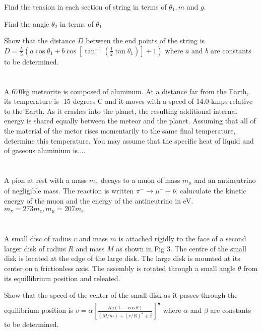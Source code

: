 \documentclass{article}
\newcommand{\half}{\frac{1}{2}}
\newcommand{\<}{\langle}
\renewcommand{\>}{\rangle}
\begin{document}
Find the tension in each section of string in terms of $\theta_1, m$ and $g$.

Find the angle $\theta_2$ in terms of $\theta_1$

Show that the distance $D$ between the end points of the string is $D = \frac{L}{5} (a \cos\theta_1 + b\cos[\tan^{-1}(\half\tan\theta_1)] + 1)$ where $a$ and $b$ are constants to be determined.

\section{}

A 670kg meteorite is composed of aluminum. At a distance far from the Earth, its temperature is -15 degrees C and it moves with a speed of 14.0 kmps relative to the Earth. As it crashes into the planet, the resulting additional internal energy is shared equally between the meteor and the planet. Assuming that all of the material of the metor rises momentarily to the same final temperature, determine this temperature. You may assume that the specific heat of liquid and of gaseous aluminium is....

\section{}

A pion at rest with a mass $m_\pi$ decays to a muon of mass $m_\mu$ and an antineutrino of negligible mass. The reaction is written $\pi^- \rightarrow \mu^- + \bar\nu$. caluculate the kinetic energy of the muon and the energy of the antineutrino in eV. $m_\pi = 273m_e, m_\mu = 207m_e$

\section{}

A small disc of radius $r$ and mass $m$ is attached rigidly to the face of a second larger disk of radius $R$ and mass $M$ as shown in Fig 3. The centre of the small disk is located at the edge of the large disk. The large disk is mounted at its center on a frictionless axis. The assembly is rotated through a small angle $\theta$ from its equillibrium position and releated.

Show that the speed of the center of the small disk as it passes through the equilibrium position is $v = \alpha[\frac{Rg(1 - \cos\theta)}{(M/m) + (r/R)^2 + \beta}]^\half$ where $\alpha$ and $\beta$ are constants to be determined.
\end{document}

